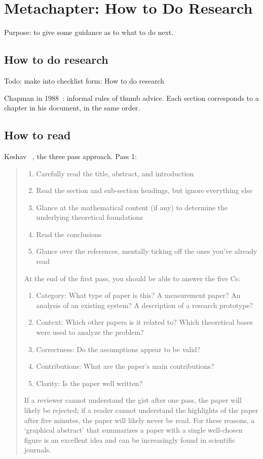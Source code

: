 \chapter{Metachapter: How to Do Research}

Purpose: to give some guidance as to what to do next.

\section{How to do research}
Todo: make into checklist form: How to do research \cite{chapman1988how}
\cite{hwang2008how}
\cite{desjardins2008how}

Chapman in 1988~\cite{chapman1988how}: informal rules of thumb advice. Each
section corresponds to a chapter in his document, in the same order.


\section{How to read}

Keshav \etal~\cite{keshav2013how}, the three pass approach.
Pass 1:
\blockquote{
\begin{enumerate}
\item  Carefully read the title, abstract, and introduction
\item  Read the section and sub-section headings, but ignore
everything else
\item  Glance at the mathematical content (if any) to determine
the underlying theoretical foundations
\item  Read the conclusions
\item  Glance over the references, mentally ticking off the
ones you’ve already read
\end{enumerate}

At the end of the first pass, you should be able to answer
the five Cs:
\begin{enumerate}
\item Category: What type of paper is this? A measurement
paper? An analysis of an existing system? A
description of a research prototype?
\item Context: Which other papers is it related to? Which
theoretical bases were used to analyze the problem?
\item Correctness: Do the assumptions appear to be valid?
\item Contributions: What are the paper’s main contributions?
\item Clarity: Is the paper well written?
\end{enumerate}

If a reviewer
cannot understand the gist after one pass, the paper will
likely be rejected; if a reader cannot understand the highlights
of the paper after five minutes, the paper will likely
never be read. For these reasons, a ‘graphical abstract’ that
summarizes a paper with a single well-chosen figure is an excellent
idea and can be increasingly found in scientific journals.
}

